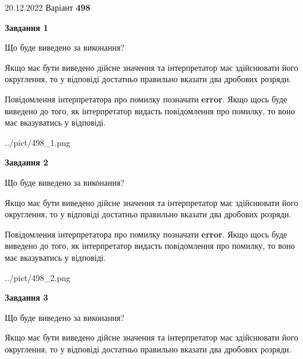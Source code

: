 \documentclass[12pt, ukrainian]{article}
\begin{document}
{20.12.2022 Варіант \No \textbf { 498 }\par}
{
\begin {Large}

{\begin {center}\textbf{Завдання 1}\end {center}}\par
Що буде виведено за виконання? \par

Якщо має бути виведено дійсне значення та інтерпретатор має здійснювати його округлення, 
то у відповіді достатньо правильно вказати два дробових розряди.

Повідомлення інтерпретатора про помилку позначати \textbf{error}.
Якщо щось буде виведено до того, як інтерпретатор видасть повідомлення про помилку, 
то воно має вказуватись у відповіді. \par

\begin{center}
	{../pict/498_1.png}
\end{center}
\newpage

{\begin {center}\textbf{Завдання 2}\end {center}}\par
Що буде виведено за виконання? \par

Якщо має бути виведено дійсне значення та інтерпретатор має здійснювати його округлення, 
то у відповіді достатньо правильно вказати два дробових розряди.

Повідомлення інтерпретатора про помилку позначати \textbf{error}.
Якщо щось буде виведено до того, як інтерпретатор видасть повідомлення про помилку, 
то воно має вказуватись у відповіді. \par

\begin{center}
	{../pict/498_2.png}
\end{center}
\newpage

{\begin {center}\textbf{Завдання 3}\end {center}}\par
Що буде виведено за виконання? \par

Якщо має бути виведено дійсне значення та інтерпретатор має здійснювати його округлення, 
то у відповіді достатньо правильно вказати два дробових розряди.


\end{Large}}
\end{document}

